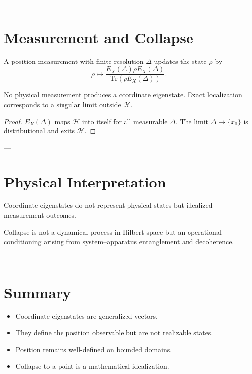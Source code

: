 \documentclass[11pt]{article}
\begin{document}
---

\section{Measurement and Collapse}

\begin{axiom}
A position measurement with finite resolution $\Delta$ updates the state $\rho$ by
\[
\rho \mapsto \frac{E_X(\Delta)\rho E_X(\Delta)}{\mathrm{Tr}(\rho E_X(\Delta))}.
\]
\end{axiom}

\begin{theorem}
No physical measurement produces a coordinate eigenstate.
Exact localization corresponds to a singular limit outside $\mathcal H$.
\end{theorem}

\begin{proof}
$E_X(\Delta)$ maps $\mathcal H$ into itself for all measurable $\Delta$.
The limit $\Delta\to\{x_0\}$ is distributional and exits $\mathcal H$.
\end{proof}

---

\section{Physical Interpretation}

\begin{proposition}
Coordinate eigenstates do not represent physical states but idealized measurement outcomes.
\end{proposition}

\begin{remark}
Collapse is not a dynamical process in Hilbert space but an operational conditioning
arising from system--apparatus entanglement and decoherence.
\end{remark}

---

\section{Summary}

\begin{itemize}
\item Coordinate eigenstates are generalized vectors.
\item They define the position observable but are not realizable states.
\item Position remains well-defined on bounded domains.
\item Collapse to a point is a mathematical idealization.
\end{itemize}
\end{document}
